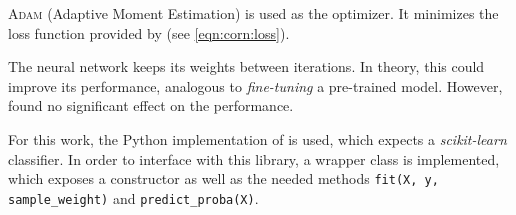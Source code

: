 \textsc{Adam} (Adaptive Moment Estimation) \cite{adam} is used as the optimizer.
It minimizes the loss function provided by \corn{} (see \autoref{eqn:corn:loss}).

The neural network keeps its weights between \dsea{} iterations.
In theory,
  this could improve its performance,
    analogous to \emph{fine-tuning} a pre-trained model.
However,
\cite{dsea_samuel}
found
no significant effect on the performance.


For this work, the Python implementation of \dsea{} \cite{dsea_code} is used,
  which expects a \emph{scikit-learn} classifier.
In order to interface with this library,
a wrapper class is implemented,
  which exposes a constructor as well as the needed methods
  \texttt{fit(X, y, sample_weight)} and
  \texttt{predict_proba(X)}.
